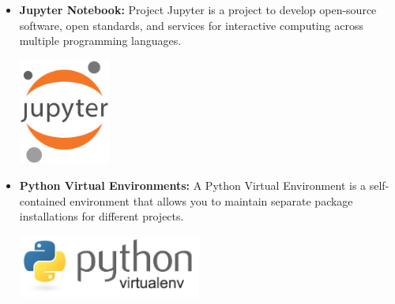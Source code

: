 \begin{itemize}
    \item \textbf{Jupyter Notebook:} \newline \cite{wikipedia} Project Jupyter is a project to develop open-source software, open standards, and services for interactive computing across multiple programming languages. \newline
          \begin{minipage}{\linewidth}
              \centering
              \includegraphics[width=3cm]{src/assets/logos/jupyter_notebook.jpg}
          \end{minipage}
    \item \textbf{Python Virtual Environments:} \newline A Python Virtual Environment is a self-contained environment that allows you to maintain separate package installations for different projects. \newline \newline
          \begin{minipage}{\linewidth}
              \centering
              \includegraphics[width=6cm]{src/assets/logos/python_virtualenv.png}
          \end{minipage}
          \newpage


\end{itemize}
